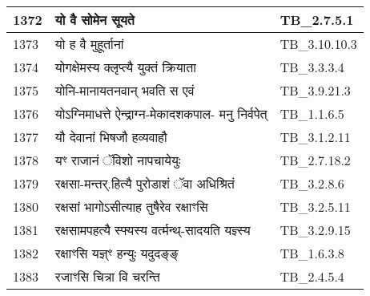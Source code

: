 \documentclass[17pt]{extarticle}
\begin{document}
\begin{longtable}{||p{0.4in}||p{4.9in}||p{0.9in}||}
    \hline
        
    1372 & यो वै सोमेन सूयते & TB\_2.7.5.1       \\
    
    \hline
        
    1373 & यो ह वै मुहूर्तानां & TB\_3.10.10.3       \\
    
    \hline
        
    1374 & योगक्षेमस्य क्लृप्त्यै युक्तं क्रियाता & TB\_3.3.3.4       \\
    
    \hline
        
    1375 & योनि{-}मानायतनवान् भवति स एवं & TB\_3.9.21.3       \\
    
    \hline
        
    1376 & योऽग्निमाधत्ते ऐन्द्राग्न{-}मेकादशकपाल{-} मनु निर्वपेत् & TB\_1.1.6.5       \\
    
    \hline
        
    1377 & यौ देवानां भिषजौ हव्यवाहौ & TB\_3.1.2.11       \\
    
    \hline
        
    1378 & यꣳ राजानं ॅविशो नापचायेयुः & TB\_2.7.18.2       \\
    
    \hline
        
    1379 & रक्षसा{-}मन्तर्.हित्यै पुरोडाशं ॅवा अधिश्रितं & TB\_3.2.8.6       \\
    
    \hline
        
    1380 & रक्षसां भागोऽसीत्याह तुषैरेव रक्षाꣳसि & TB\_3.2.5.11       \\
    
    \hline
        
    1381 & रक्षसामपहत्यै स्फ्यस्य वर्त्मन्थ्{-}सादयति यज्ञ्स्य & TB\_3.2.9.15       \\
    
    \hline
        
    1382 & रक्षाꣳसि यज्ञ्ꣳ हन्युः यदुदङ्ङ् & TB\_1.6.3.8       \\
    
    \hline
        
    1383 & रजाꣳसि चित्रा वि चरन्ति & TB\_2.4.5.4       \\
    
    \hline
        

\end{longtable}
\end{document}
